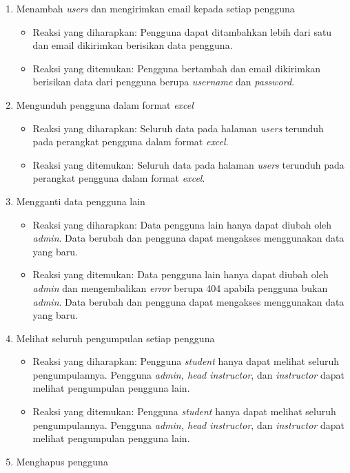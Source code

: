\begin{enumerate}
\begin{itemize}
	 \end{itemize}
	 \item Menambah \textit{users} dan mengirimkan email kepada setiap pengguna
	 \begin{itemize}
	 	\item Reaksi yang diharapkan: Pengguna dapat ditambahkan lebih dari satu dan email dikirimkan berisikan data pengguna.
	 	\item Reaksi yang ditemukan: Pengguna bertambah dan email dikirimkan berisikan data dari pengguna berupa \textit{username} dan \textit{password}.
	 \end{itemize}
	 \item Mengunduh pengguna dalam format \textit{excel}
	 \begin{itemize}
	 	\item Reaksi yang diharapkan: Seluruh data pada halaman \textit{users} terunduh pada perangkat pengguna dalam format \textit{excel}.
	 	\item Reaksi yang ditemukan: Seluruh data pada halaman \textit{users} terunduh pada perangkat pengguna dalam format \textit{excel}.
	 \end{itemize}
	 \item Mengganti data pengguna lain
	 \begin{itemize}
	 	\item Reaksi yang diharapkan: Data pengguna lain hanya dapat diubah oleh \textit{admin}. Data berubah dan pengguna dapat mengakses menggunakan data yang baru.
	 	\item Reaksi yang ditemukan: Data pengguna lain hanya dapat diubah oleh \textit{admin} dan mengembalikan \textit{error} berupa 404 apabila pengguna bukan \textit{admin}. Data berubah dan pengguna dapat mengakses menggunakan data yang baru.
	 \end{itemize}
	 \item Melihat seluruh pengumpulan setiap pengguna
	 \begin{itemize}
	 	\item Reaksi yang diharapkan: Pengguna \textit{student} hanya dapat melihat seluruh pengumpulannya. Pengguna \textit{admin, head instructor}, dan \textit{instructor} dapat melihat pengumpulan pengguna lain.
	 	\item Reaksi yang ditemukan: Pengguna \textit{student} hanya dapat melihat seluruh pengumpulannya. Pengguna \textit{admin, head instructor}, dan \textit{instructor} dapat melihat pengumpulan pengguna lain.
	 \end{itemize}
	 \item Menghapus pengguna

\end{enumerate}
